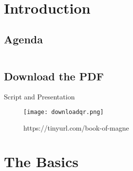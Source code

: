 \begin{frame}[t,plain]
    \titlepage
\end{frame}



\section{Introduction}
\subsection*{Agenda}
\begin{frame}
    
    \begin{columns}[t]
        \begin{column}{.5\textwidth}
            \tableofcontents[sections={1-6}]
        \end{column}
        \begin{column}{.5\textwidth}
            \tableofcontents[sections={7-}]
        \end{column}
    \end{columns}
\end{frame}


\subsection*{Download the PDF}
\begin{frame}{Script and Presentation}
    \begin{figure}
        \centering
        \texttt{[image: downloadqr.png]}
        \caption{https://tinyurl.com/book-of-magne}
        \label{fig:qrcode}
    \end{figure}
\end{frame}


%
\section{The Basics}


